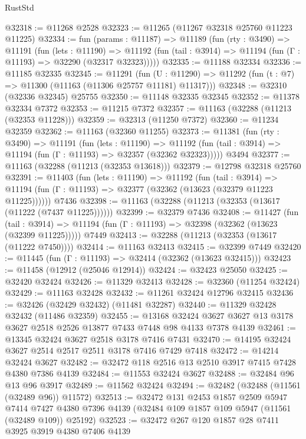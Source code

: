 \begin{lexlean}{RustStd}
\begin{coremodule}
@32318 := @11268 @2528
@32323 := @11265 (@11267 @32318 @25760 @11223 @11225)
@32334 := fun (params : @11187) =>
  @11189
    (fun (rty : @3490) =>
    @11191
      (fun (lets : @11190) =>
      @11192 (fun (tail : @3914) => @11194 (fun (Γ : @11193) => @32290 (@32317 @32323)))))
@32335 := @11188 @32334
@32336 := @11185 @32335
@32345 := @11291
    (fun (U : @11290) => @11292 (fun (t : @7) => @11300 (@11163 (@11306 @25757 @11181) @11317)))
@32348 := @32310 (@32336 @32345) @25755
@32350 := @11148 @32335 @32345
@32352 := @11378 @32334 @7372
@32353 := @11215 @7372
@32357 := @11163 (@32288 (@11213 (@32353 @11228)))
@32359 := @32313 (@11250 @7372)
@32360 := @11234 @32359
@32362 := @11163 (@32360 @11255)
@32373 := @11381
    (fun (rty : @3490) =>
    @11191
      (fun (lets : @11190) =>
      @11192 (fun (tail : @3914) => @11194 (fun (Γ : @11193) => @32357 (@32362 @32323)))))
    @3494
@32377 := @11163 (@32288 (@11213 (@32353 @13618)))
@32379 := @12798 @32318 @25760
@32391 := @11403
    (fun (lets : @11190) =>
    @11192
      (fun (tail : @3914) =>
      @11194 (fun (Γ : @11193) => @32377 (@32362 (@13623 (@32379 @11223 @11225))))))
    @7436
@32398 := @11163 (@32288 (@11213 (@32353 (@13617 (@11222 (@7437 @11225))))))
@32399 := @32379 @7436
@32408 := @11427
    (fun (tail : @3914) => @11194 (fun (Γ : @11193) => @32398 (@32362 (@13623 (@32399 @11225)))))
    @7449
@32413 := @32288 (@11213 (@32353 (@13617 (@11222 @7450))))
@32414 := @11163 @32413
@32415 := @32399 @7449
@32420 := @11445 (fun (Γ : @11193) => @32414 (@32362 (@13623 @32415)))
@32423 := @11458 (@12912 (@25046 @12914))
@32424 := @32423 @25050
@32425 := @32420 @32424
@32426 := @11329 @32413
@32428 := @32360 (@11254 @32424)
@32429 := @11163 @32428
@32432 := @11261 @32424 @12796 @32415
@32436 := @32426 (@32429 @32432) (@11481 @32287)
@32440 := @11329 @32428 @32432 (@11486 @32359)
@32455 := @13168
    @32424
    @3627
    @3627
    @13
    @3178
    @3627
    @2518
    @2526
    @13877
    @7433
    @7448
    @98
    @4133
    @7378
    @4139
@32461 := @13345 @32424 @3627 @2518 @3178 @7416 @7431
@32470 := @14195 @32424 @3627 @2514 @2517 @2511 @3178 @7416 @7429 @7418
@32472 := @14214 @32424 @3627
@32482 := @32472 @118 @2516 @13 @2510 @3917 @7415 @7428 @4380 @7386 @4139
@32484 := @11553 @32424 @3627
@32488 := @32484 @96 @13 @96 @3917
@32489 := @11562 @32424
@32494 := @32482 (@32488 (@11561 (@32489 @96)) @11572)
@32513 := @32472
    @131
    @2453
    @1857
    @2509
    @5947
    @7414
    @7427
    @4380
    @7396
    @4139
    (@32484 @109 @1857 @109 @5947 (@11561 (@32489 @109)) @25192)
@32523 := @32472 @267 @120 @1857 @28 @7411 @3925 @3919 @4380 @7406 @4139

\end{coremodule}
\end{lexlean}
